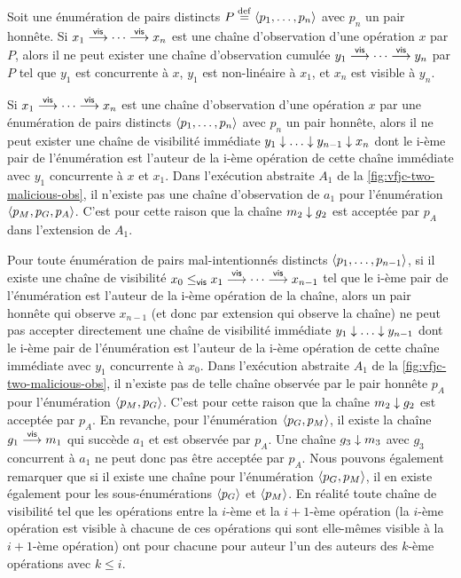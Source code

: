 Soit une énumération de pairs distincts $P \defeq \tuple*{p_1, \dotsc ,p_n}$ avec $p_n$ un pair honnête.
Si $x_1 \vis \dotsb \vis x_n$ est une chaîne d'observation d'une opération $x$ par $P$, alors il ne peut exister une chaîne d'observation cumulée $y_1 \vis \dotsb \vis y_n$ par $P$ tel que $y_1$ est concurrente à $x$, $y_1$ est non-linéaire à $x_1$, et $x_n$ est visible à $y_n$.

Si $x_1 \vis \dotsb \vis x_n$ est une chaîne d'observation d'une opération $x$ par une énumération de pairs distincts $\tuple*{p_1, \dotsc ,p_n}$ avec $p_n$ un pair honnête, alors il ne peut exister une chaîne de visibilité immédiate $y_1 \idr \dotsc \idr y_{n-1} \idr x_n$ dont le i-ème pair de l'énumération est l'auteur de la i-ème opération de cette chaîne immédiate avec $y_1$ concurrente à $x$ et $x_1$.
Dans l'exécution abstraite $A_1$ de la \autoref{fig:vfjc-two-malicious-obs}, il n'existe pas une chaîne d'observation de $a_1$ pour l'énumération $\tuple*{p_M, p_G, p_A}$.
C'est pour cette raison que la chaîne $m_2 \idr g_2$ est acceptée par $p_A$ dans l'extension de $A_1$.

Pour toute énumération de pairs mal-intentionnés distincts $\tuple*{p_1, \dotsc ,p_{n-1}}$, si il existe une chaîne de visibilité $x_0 \viseq x_1 \vis \dotsb \vis x_{n-1}$ tel que le i-ème pair de l'énumération est l'auteur de la i-ème opération de la chaîne, alors un pair honnête qui observe $x_{n-1}$ (et donc par extension qui observe la chaîne) ne peut pas accepter directement une chaîne de visibilité immédiate $y_1 \idr \dotsc \idr y_{n-1}$ dont le i-ème pair de l'énumération est l'auteur de la i-ème opération de cette chaîne immédiate avec $y_1$ concurrente à $x_0$.
Dans l'exécution abstraite $A_1$ de la \autoref{fig:vfjc-two-malicious-obs}, il n'existe pas de telle chaîne observée par le pair honnête $p_A$ pour l'énumération $\tuple*{p_M, p_G}$.
C'est pour cette raison que la chaîne $m_2 \idr g_2$ est acceptée par $p_A$.
En revanche, pour l'énumération $\tuple*{p_G, p_M}$, il existe la chaîne $g_1 \vis m_1$ qui succède $a_1$ et est observée par $p_A$.
Une chaîne $g_3 \idr m_3$ avec $g_3$ concurrent à $a_1$ ne peut donc pas être acceptée par $p_A$.
Nous pouvons également remarquer que si il existe une chaîne pour l'énumération $\tuple*{p_G, p_M}$, il en existe également pour les sous-énumérations $\tuple*{p_G}$ et $\tuple*{p_M}$.
En réalité toute chaîne de visibilité tel que les opérations entre la $i$-ème et la $i+1$-ème opération (la $i$-ème opération est visible à chacune de ces opérations qui sont elle-mêmes visible à la $i+1$-ème opération) ont pour chacune pour auteur l'un des auteurs des $k$-ème opérations avec $k \leq i$.

